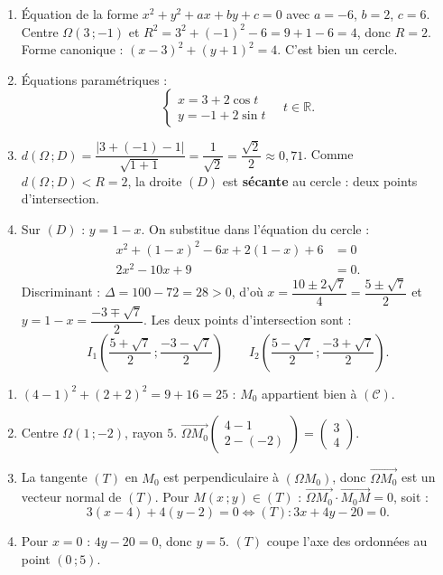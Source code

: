 \documentclass[11pt]{article}
\begin{document}
\begin{corrige}
\begin{enumerate}
\item Équation de la forme $x^2+y^2+ax+by+c=0$ avec $a=-6$, $b=2$, $c=6$. Centre $\Omega\left(3\,;-1\right)$ et $R^2=3^2+(-1)^2-6=9+1-6=4$, donc $R=2$. Forme canonique : $(x-3)^2+(y+1)^2=4$. C'est bien un cercle.
\item Équations paramétriques :
\[ \begin{cases} x=3+2\cos t \\ y=-1+2\sin t \end{cases} \quad t\in\mathbb{R}. \]
\item $d(\Omega\,;D)=\dfrac{|3+(-1)-1|}{\sqrt{1+1}}=\dfrac{1}{\sqrt{2}}=\dfrac{\sqrt{2}}{2}\approx 0{,}71$. Comme $d(\Omega\,;D)<R=2$, la droite $(D)$ est \textbf{sécante} au cercle : deux points d'intersection.
\item Sur $(D)$ : $y=1-x$. On substitue dans l'équation du cercle :
\begin{align*}
x^2+(1-x)^2-6x+2(1-x)+6&=0\\
2x^2-10x+9&=0.
\end{align*}
Discriminant : $\Delta=100-72=28>0$, d'où $x=\dfrac{10\pm 2\sqrt{7}}{4}=\dfrac{5\pm\sqrt{7}}{2}$ et $y=1-x=\dfrac{-3\mp\sqrt{7}}{2}$. Les deux points d'intersection sont :
\[ I_1\left(\dfrac{5+\sqrt{7}}{2}\,;\dfrac{-3-\sqrt{7}}{2}\right) \qquad I_2\left(\dfrac{5-\sqrt{7}}{2}\,;\dfrac{-3+\sqrt{7}}{2}\right). \]
\end{enumerate}
\end{corrige}

\begin{corrige}
\begin{enumerate}
\item $(4-1)^2+(2+2)^2=9+16=25$ : $M_0$ appartient bien à $(\mathscr{C})$.
\item Centre $\Omega(1\,;-2)$, rayon $5$. $\overrightarrow{\Omega M_0}\begin{pmatrix} 4-1 \\ 2-(-2) \end{pmatrix}=\begin{pmatrix} 3 \\ 4 \end{pmatrix}$.
\item La tangente $(T)$ en $M_0$ est perpendiculaire à $(\Omega M_0)$, donc $\overrightarrow{\Omega M_0}$ est un vecteur normal de $(T)$. Pour $M(x\,;y)\in(T)$ : $\overrightarrow{\Omega M_0}\cdot\overrightarrow{M_0M}=0$, soit :
\[ 3(x-4)+4(y-2)=0 \iff (T):3x+4y-20=0. \]
\item Pour $x=0$ : $4y-20=0$, donc $y=5$. $(T)$ coupe l'axe des ordonnées au point $(0\,;5)$.
\end{enumerate}
\end{corrige}
\end{document}
